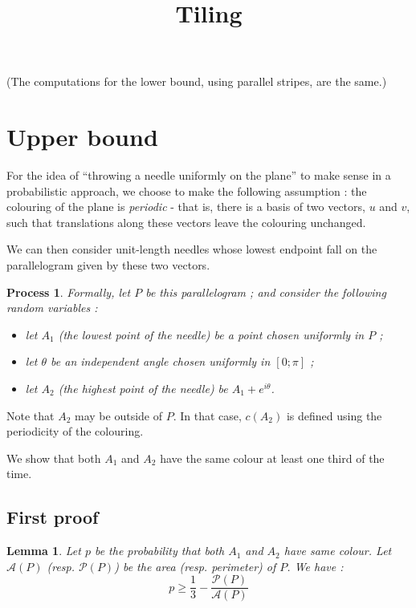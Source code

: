 \documentclass[a4paper,11pt]{article}
\title{Tiling}
\newtheorem{lemma}{Lemma}
\newtheorem{process}{Process}
\begin{document}
(The computations for the lower bound, using parallel stripes, are the same.)

\section{Upper bound}


For the idea of ``throwing a needle uniformly on the plane'' to make sense in a probabilistic approach, we choose to make the following assumption : 
the colouring of the plane is \textit{periodic} - that is, there is a basis of two vectors, $u$ and $v$, such that translations along these vectors leave the colouring unchanged.

We can then consider unit-length needles whose lowest endpoint fall on the parallelogram given by these two vectors.

\begin{process}

Formally, let $P$ be this parallelogram ; and consider the following random variables :
\begin{itemize}
  \item let $A_1$ (the lowest point of the needle) be a point chosen uniformly in $P$ ;
  \item let $\theta$ be an independent angle chosen uniformly in $[0;\pi]$ ;
  \item let $A_2$ (the highest point of the needle) be $A_1 + e^{i \theta}$.
\end{itemize}
\end{process}

Note that $A_2$ may be outside of $P$. In that case, $c(A_2)$ is defined using the periodicity of the colouring.

We show that both $A_1$ and $A_2$ have the same colour at least one third of the time.

\subsection*{First proof}

\begin{lemma}
 Let $p$ be the probability that both $A_1$ and $A_2$ have same colour. Let $\mathcal{A}(P)$ (resp. $\mathcal{P}(P)$) be the area (resp. perimeter) of $P$. We have :
 \[p \geq \frac{1}{3} - \frac{\mathcal{P}(P)}{\mathcal{A}(P)} \]
\end{lemma}
\end{document}
